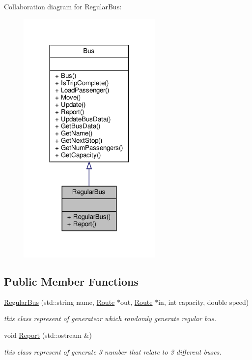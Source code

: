 Collaboration diagram for Regular\+Bus\+:
\nopagebreak
\begin{figure}[H]
\begin{center}
\leavevmode
\includegraphics[width=200pt]{classRegularBus__coll__graph}
\end{center}
\end{figure}
\subsection*{Public Member Functions}
\begin{DoxyCompactItemize}
\item 
\hyperlink{classRegularBus_ac97f3951dee6538eb86d36ea0457947e}{Regular\+Bus} (std\+::string name, \hyperlink{classRoute}{Route} $\ast$out, \hyperlink{classRoute}{Route} $\ast$in, int capacity, double speed)
\begin{DoxyCompactList}\small\item\em this class represent of generateor which randomly generate regular bus. \end{DoxyCompactList}\item 
void \hyperlink{classRegularBus_a6ff6c67f22040ab2c9ad23649c3ba9dc}{Report} (std\+::ostream \&)
\begin{DoxyCompactList}\small\item\em this class represent of generate 3 number that relate to 3 different buses. \end{DoxyCompactList}\end{DoxyCompactItemize}


